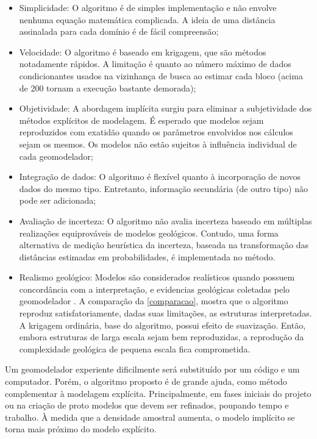 \begin{itemize}
\item Simplicidade: O algoritmo é de simples implementação e não envolve nenhuma equação matemática complicada. A ideia de uma distância assinalada para cada domínio é de fácil compreensão;
\item Velocidade: O algoritmo é baseado em krigagem, que são métodos notadamente rápidos. A limitação é quanto ao número máximo de dados condicionantes usados na vizinhança de busca ao estimar cada bloco (acima de 200 tornam a execução bastante demorada);
\item Objetividade: A abordagem implícita surgiu para eliminar a subjetividade dos métodos explícitos de modelagem. É esperado que modelos sejam reproduzidos com exatidão quando os parâmetros envolvidos nos cálculos sejam os mesmos. Os modelos não estão sujeitos à influência individual de cada geomodelador;
\item Integração de dados: O algoritmo é flexível quanto à incorporação de novos dados do mesmo tipo. Entretanto, informação secundária (de outro tipo) não pode ser adicionada;
\item Avaliação de incerteza: O algoritmo não avalia incerteza baseado em múltiplas realizações equiprováveis de modelos geológicos. Contudo, uma forma alternativa de medição heurística da incerteza, baseada na transformação das distâncias estimadas em probabilidades, é implementada no método.
\item Realismo geológico: Modelos são considerados realísticos quando possuem concordância com a interpretação, e evidencias geológicas coletadas pelo geomodelador \cite{maureira}. A comparação da \autoref{comparacao}, mostra que o algoritmo reproduz satisfatoriamente, dadas suas limitações, as estruturas interpretadas. A krigagem ordinária, base do algoritmo, possui efeito de suavização. Então, embora estruturas de larga escala sejam bem reproduzidas, a reprodução da complexidade geológica de pequena escala fica comprometida.
\end{itemize}

Um geomodelador experiente dificilmente será substituído por um código e um computador. Porém, o algoritmo proposto é de grande ajuda, como método complementar à modelagem explícita. Principalmente, em fases iniciais do projeto ou na criação de proto modelos que devem ser refinados, poupando tempo e trabalho. À medida que a densidade amostral aumenta, o modelo implícito se torna mais próximo do modelo explícito.

